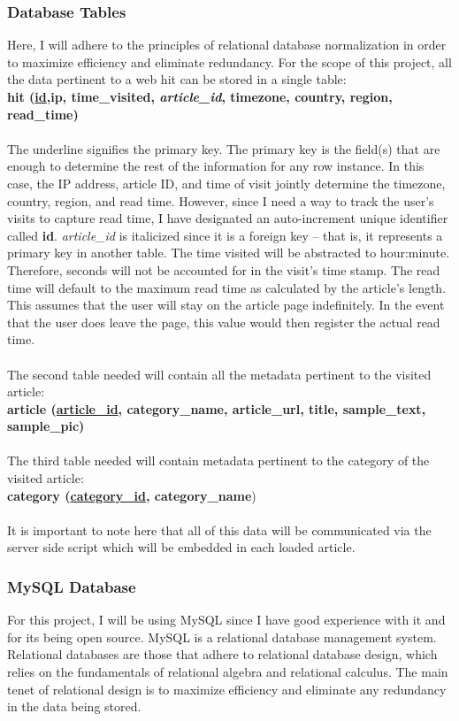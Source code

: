 \documentclass[12pt]{article}
\begin{document}
\subsubsection{Database Tables}
Here, I will adhere to the principles of relational database normalization in order to maximize efficiency and eliminate redundancy. For the scope of this project, all the data pertinent to a web hit can be stored in a single table: \\ 
{\large\textbf{hit (\underline{id},ip, time\_visited, \textit{article\_id}, timezone, country, region, read\_time)}} \\ \\
The underline signifies the primary key. The primary key is the field(s) that are enough to determine the rest of the information for any row instance. In this case, the IP address, article ID, and time of visit jointly determine the timezone, country, region, and read time. However, since I need a way to track the user's visits to capture read time, I have designated an auto-increment unique identifier called \textbf{id}. \textit{article\_id} is italicized since it is a foreign key -- that is, it represents a primary key in another table. The time visited will be abstracted to hour:minute. Therefore, seconds will not be accounted for in the visit's time stamp. The read time will default to the maximum read time as calculated by the article's length. This assumes that the user will stay on the article page indefinitely. In the event that the user does leave the page, this value would then register the actual read time.
\\ \\
The second table needed will contain all the metadata pertinent to the visited article:\\
{\large\textbf{article (\underline{article\_id}, category\_name, article\_url, title, sample\_text, sample\_pic)}} \\ \\

The third table needed will contain metadata pertinent to the category of the visited article:\\
{\large\textbf{category (\underline{category\_id}, category\_name})}
\\ \\

It is important to note here that all of this data will be communicated via the server side script which will be embedded in each loaded article. 

\subsubsection{MySQL Database}
For this project, I will be using MySQL since I have good experience with it and for its being open source. MySQL is a relational database management system. Relational databases are those that adhere to relational database design, which relies on the fundamentals of relational algebra and relational calculus. The main tenet of relational design is to maximize efficiency and eliminate any redundancy in the data being stored.
\end{document}
